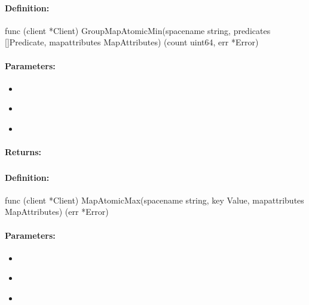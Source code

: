 \paragraph{Definition:}
\begin{gocode}
func (client *Client) GroupMapAtomicMin(spacename string, predicates []Predicate, mapattributes MapAttributes) (count uint64, err *Error)
\end{gocode}

\paragraph{Parameters:}
\begin{itemize}[noitemsep]
\item {}\\

\item {}\\

\item {}\\

\end{itemize}

\paragraph{Returns:}


\pagebreak
\subsubsection{}
\label{api:Go:MapAtomicMax}


\paragraph{Definition:}
\begin{gocode}
func (client *Client) MapAtomicMax(spacename string, key Value, mapattributes MapAttributes) (err *Error)
\end{gocode}

\paragraph{Parameters:}
\begin{itemize}[noitemsep]
\item {}\\

\item {}\\

\item {}\\

\end{itemize}

